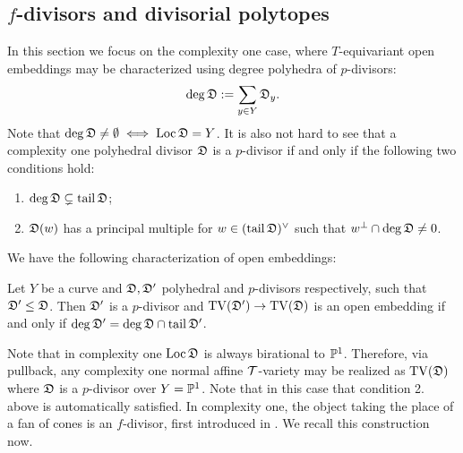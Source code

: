 \subsection{\(f\)-divisors and divisorial polytopes}
In this section we focus on the complexity one case, where \(T\)-equivariant open embeddings may be characterized using degree polyhedra of \(p\)-divisors:
\[
\deg {\mathfrak{D}} := \sum_{y \in Y} {\mathfrak{D}}_y.
\]
Note that \(\deg {\mathfrak{D}} \neq \emptyset \iff \operatorname{Loc} {\mathfrak{D}} = Y\). It is also not hard to see that a complexity one polyhedral divisor \({\mathfrak{D}}\) is a \(p\)-divisor if and only if the following two conditions hold:
\begin{enumerate}
\item \(\deg {\mathfrak{D}} \subsetneq \operatorname{tail} {\mathfrak{D}}\);
\item \({\mathfrak{D}}(w)\) has a principal multiple for \(w \in (\operatorname{tail} {\mathfrak{D}} )^\vee\) such that \(w^\perp \cap \deg {\mathfrak{D}} \neq 0\).
\end{enumerate}
We have the following characterization of open embeddings:
\begin{theorem}
Let \(Y\) be a curve and \({\mathfrak{D}},{\mathfrak{D}}'\) polyhedral and \(p\)-divisors respectively, such that \({\mathfrak{D}}' \le {\mathfrak{D}}\). Then \({\mathfrak{D}}'\) is a \(p\)-divisor and \(\operatorname{TV}({\mathfrak{D}}') \to \operatorname{TV}({\mathfrak{D}}) \) is an open embedding if and only if \(\deg {\mathfrak{D}}' = \deg {\mathfrak{D}} \cap \operatorname{tail} {\mathfrak{D}}'\).
\end{theorem}
Note that in complexity one \(\operatorname{Loc} {\mathfrak{D}} \) is always birational to \(\mathbb{P}^1\). Therefore, via pullback, any complexity one normal affine \({\mathcal{T}}\)-variety may be realized as \(\operatorname{TV}({\mathfrak{D}})\) where \({\mathfrak{D}}\) is a \(p\)-divisor over \(Y = \mathbb{P}^1\). Note that in this case that condition 2. above is automatically satisfied. In complexity one, the object taking the place of a fan of cones is an \(f\)-divisor, first introduced in \cite{ilten2009polarized}. We recall this construction now.

